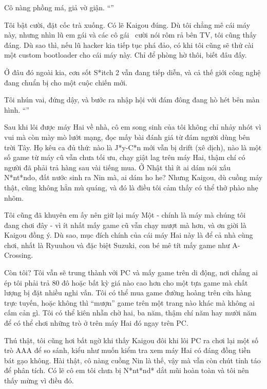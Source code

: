 \documentclass[../main.tex]{subfiles}
\begin{document}
Cô nàng phồng má, giả vờ giận. ``''

Tôi bật cười, đặt cốc trà xuống. Có lẽ Kaigou đúng. Dù tôi chẳng mê cái máy này, nhưng nhìn lũ em gái và các cô gái \hll\ cười nói rôm rả bên TV, tôi cũng thấy đáng. Dù sao thì, nếu lũ hacker kia tiếp tục phá đảo, có khi tôi cũng sẽ thử cài một custom bootloader cho cái máy này. Chỉ để phòng hờ thôi, biết đâu đấy.

Ở đâu đó ngoài kia, cơn sốt S*itch 2 vẫn đang tiếp diễn, và cả thế giới công nghệ đang chuẩn bị cho một cuộc chiến mới.

Tôi nhún vai, đứng dậy, và bước ra nhập hội với đám đông đang hò hét bên màn hình. ``''

Sau khi lôi được máy Hai về nhà, cô em song sinh của tôi không chỉ nhảy nhót vì vui mà còn mày mò lướt mạng, đọc mấy bài đánh giá từ đám người dùng bên trời Tây. Họ kêu ca đủ thứ: nào là J*y-C*n mới vẫn bị drift (xê dịch), nào là một số game từ máy cũ vẫn chưa tối ưu, chạy giật lag trên máy Hai, thậm chí có người đã phải trả hàng sau vài tiếng mua. Ở Nhật thì ít ai dám nói xấu N*nt*ndo, đất nước sinh ra Nin mà, ai dám ho he? Nhưng Kaigou, dù cuồng máy thật, cũng không hẳn mù quáng, và đó là điều tôi cảm thấy có thể thở phào nhẹ nhõm.

Tôi cũng đã khuyên em ấy nên giữ lại máy Một - chính là máy mà chúng tôi đang chơi đây - vì ít nhất mấy game cũ vẫn chạy mượt mà hơn, và ơn giời là Kaigou đồng ý. Dù sao, mục đích chính của cái máy Hai này là để cả nhà cùng chơi, nhất là Ryuuhou và đặc biệt Suzuki, con bé mê tít mấy game như A-Crossing.

Còn tôi? Tôi vẫn sẽ trung thành với PC và mấy game trên di động, nơi chẳng ai ép tôi phải trả 80 đô hoặc bất kỳ giá nào cao hơn cho một tựa game mà chất lượng bị đặt nhiều nghi vấn. Tôi có thể mua game đường hoàng trên cửa hàng trực tuyến, hoặc không thì ``mượn'' game trên một trang nào khác mà không ai cấm cản gì. Tôi có thể kiên nhẫn chờ hai, ba năm, thậm chí năm hay mười năm để có thể chơi những trò ở trên máy Hai đó ngay trên PC.

Thú thật, tôi cũng hơi bất ngờ khi thấy Kaigou đôi khi lôi PC ra chơi lại một số trò AAA để so sánh, kiểu như muốn kiểm tra xem máy Hai có đáng đồng tiền bát gạo không. Hài thật, cô nàng cuồng Nin là thế, vậy mà vẫn còn chút tỉnh táo để phân tích. Có lẽ cô em tôi chưa bị N*nt*nd* dắt mũi hoàn toàn và tôi nên thấy mừng vì điều đó.
\end{document}

